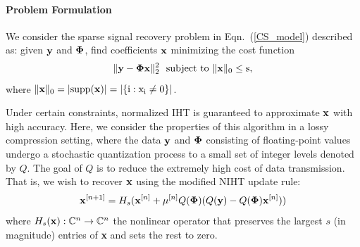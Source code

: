 \documentclass[aoas,preprint]{imsart}
\numberwithin{equation}{section}
\theoremstyle{plain}
\begin{document}
\vspace{.5em}
\paragraph*{Problem Formulation}
 We consider the sparse signal recovery problem in Eqn.~(\ref{CS_model}) described as: given ${\bf y}$ and ${\bf \Phi}$, find coefficients ${\bf x}$ minimizing the cost function
 \begin{equation}\label{cost_function}
     \|{\bf y} - {\bf \Phi x} \|_2^2 \ \ \rm{subject \ to \ \|{\bf x} \|_0 \leq s},
 \end{equation}
 where $\|{\bf x} \|_0 = |\rm{supp}({\bf x})| = |\{i: x_i\neq 0 \}|$.
 
\vspace{0.5em}

Under certain constraints, normalized IHT is guaranteed to approximate ${\bf x}$ with high accuracy. Here, we consider the properties of this algorithm in a lossy compression setting, where the data ${\bf y}$ and ${\bf \Phi}$ consisting of floating-point values undergo a stochastic quantization process to a small set of integer levels denoted by $Q$. The goal of $Q$ is to reduce the extremely high cost of data transmission. That is, we wish to recover ${\bf x}$ using the  modified NIHT update rule:
 \begin{equation}
     {\bf x}^{[n+1]} = H_s({\bf x}^{[n]} + \mu^{[n]}Q({\bf \Phi})(Q({\bf y}) - Q({\bf \Phi}){\bf x}^{[n]}))
 \end{equation}
where $H_s({\bf x}): \mathbb{C}^n \rightarrow \mathbb{C}^n$ the nonlinear operator that preserves the largest $s$ (in magnitude) entries of {\bf x} and sets the rest to zero. 
 
     
\end{document}
